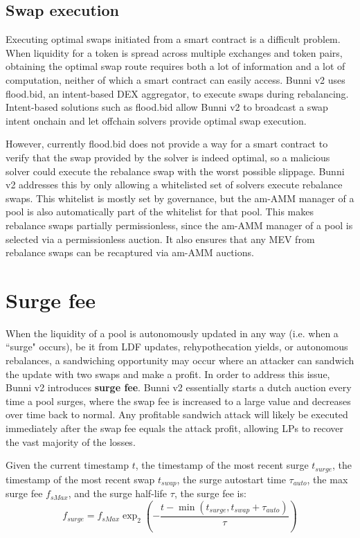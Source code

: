 \documentclass[twocolumn]{article}
\begin{document}
\subsection{Swap execution}

Executing optimal swaps initiated from a smart contract is a difficult problem. When liquidity for a token is spread across multiple exchanges and token pairs, obtaining the optimal swap route requires both a lot of information and a lot of computation, neither of which a smart contract can easily access. Bunni v2 uses flood.bid, an intent-based DEX aggregator, to execute swaps during rebalancing. Intent-based solutions such as flood.bid allow Bunni v2 to broadcast a swap intent onchain and let offchain solvers provide optimal swap execution.  

However, currently flood.bid does not provide a way for a smart contract to verify that the swap provided by the solver is indeed optimal, so a malicious solver could execute the rebalance swap with the worst possible slippage. Bunni v2 addresses this by only allowing a whitelisted set of solvers execute rebalance swaps. This whitelist is mostly set by governance, but the am-AMM manager of a pool is also automatically part of the whitelist for that pool. This makes rebalance swaps partially permissionless, since the am-AMM manager of a pool is selected via a permissionless auction. It also ensures that any MEV from rebalance swaps can be recaptured via am-AMM auctions.

\section{Surge fee}

When the liquidity of a pool is autonomously updated in any way (i.e. when a ``surge" occurs), be it from LDF updates, rehypothecation yields, or autonomous rebalances, a sandwiching opportunity may occur where an attacker can sandwich the update with two swaps and make a profit. In order to address this issue, Bunni v2 introduces \textbf{surge fee}. Bunni v2 essentially starts a dutch auction every time a pool surges, where the swap fee is increased to a large value and decreases over time back to normal. Any profitable sandwich attack will likely be executed immediately after the swap fee equals the attack profit, allowing LPs to recover the vast majority of the losses.

Given the current timestamp $t$, the timestamp of the most recent surge $t_{surge}$, the timestamp of the most recent swap $t_{swap}$, the surge autostart time $\tau_{auto}$, the max surge fee $f_{sMax}$, and the surge half-life $\tau$, the surge fee is:
\begin{equation}
  f_{surge} = f_{sMax} \exp_2(-\frac{t - \min(t_{surge}, t_{swap} + \tau_{auto})}{\tau})  
\end{equation}
\end{document}
